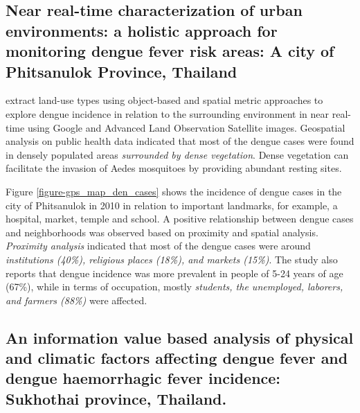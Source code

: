 \documentclass[review]{elsarticle}
\begin{document}
\subsection{Near real-time characterization of urban environments: a holistic approach for monitoring dengue fever risk areas: A city of Phitsanulok Province, Thailand}

\cite{sarfraz2014near} extract land-use types using object-based and spatial metric approaches to explore dengue incidence in relation to the surrounding environment in near real-time using Google and Advanced Land Observation Satellite images. Geospatial analysis on public health data indicated that most of the dengue cases were found in densely populated areas \textit{surrounded by dense vegetation}. Dense vegetation can facilitate the invasion of Aedes mosquitoes by providing abundant resting sites. 

Figure \ref{figure-gps_map_den_cases} shows the incidence of dengue cases in the city of Phitsanulok in 2010 in relation to important landmarks, for example, a hospital, market, temple and school. A positive relationship between dengue cases and neighborhoods was observed based on proximity and spatial analysis. \textit{Proximity analysis} indicated that most of the dengue cases were around \textit{institutions (40\%), religious places (18\%), and markets (15\%)}. The study also reports that dengue incidence was more prevalent in people of 5-24 years of age (67\%), while in terms of occupation, mostly \textit{students, the unemployed, laborers, and farmers (88\%)} were affected.



\subsection{An information value based analysis of physical and climatic factors affecting dengue fever and dengue haemorrhagic fever incidence: Sukhothai province, Thailand.}
\label{subsection-regressions-paper}
\end{document}
